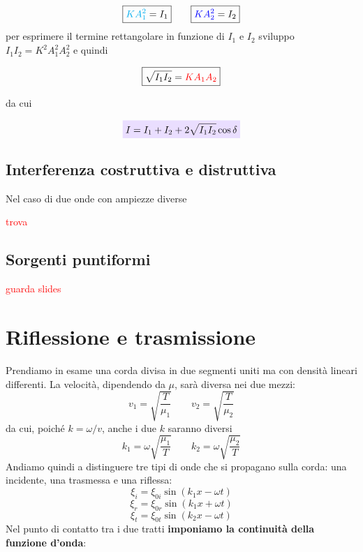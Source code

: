 \documentclass[x11names]{report}
\newcommand{\viola}[1]{\colorbox{yred}{$\displaystyle #1$}}
\begin{document}
		\[ 
		\boxed{\textcolor{cyan}{KA_1^2}= I_1} \qquad \boxed{\textcolor{blue}{KA_2^2} = I_2 } 
		\]
		per esprimere il termine rettangolare in funzione di \(I_1\) e \(I_2\) sviluppo \(I_1I_2 = K^2A_1^2A_2^2\) e quindi
		
		\[ 
		\boxed{\sqrt{I_1I_2} = \textcolor{red}{KA_1A_2}}
		\]
		
		da cui
		
		\begin{equation}
			\viola{I = I_1 + I_2 + 2\sqrt{I_1I_2}\cos\delta}
		\end{equation}
		
		
		\begin{es}{}
			\subsection{Interferenza costruttiva e distruttiva}
			Nel caso di due onde con ampiezze diverse 
			\begin{center}
				\textcolor{red}{trova}
			\end{center}
			
		\end{es}
		
		
		\subsection{Sorgenti puntiformi}
			\begin{center}
				\textcolor{red}{guarda slides}
			\end{center}
			
		\newpage
		\section{Riflessione e trasmissione}
		Prendiamo in esame una corda divisa in due segmenti uniti ma con densità lineari differenti. La velocità, dipendendo da \(\mu\), sarà diversa nei due mezzi:
		\[ 
		v_1 = \sqrt{\frac{T}{\mu_1}} \qquad v_2 = \sqrt{\frac{T}{\mu_2}} 
		\]
		da cui, poiché \(k = \omega / v\), anche i due \(k\) saranno diversi
		\[ 
		k_1 = \omega \sqrt{\frac{\mu_1}{T}} \qquad k_2 = \omega \sqrt{\frac{\mu_2}{T}} 
		\]
		Andiamo quindi a distinguere tre tipi di onde che si propagano sulla corda: una incidente, una trasmessa e una riflessa:
		\[ 
		\xi_i = \xi_{0i}\sin\left(k_1 x - \omega t\right)
		\]
		\[ 
		\xi_r = \xi_{0r}\sin\left(k_1 x + \omega t\right)
		\]
		\[ 
		\xi_t = \xi_{0t}\sin\left(k_2 x - \omega t\right)
		\]
		Nel punto di contatto tra i due tratti \textbf{imponiamo la continuità della funzione d'onda}:
		
\end{document}

